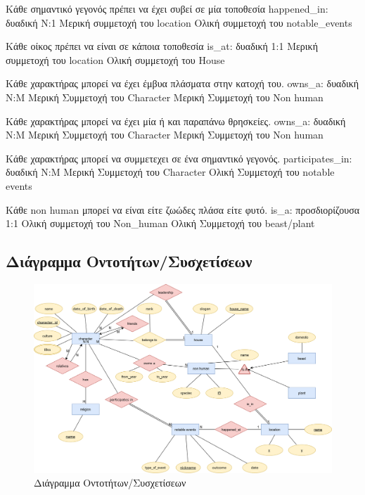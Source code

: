 \documentclass[../main.tex]{subfiles}
\begin{document}
{Κάθε σημαντικό γεγονός πρέπει να έχει συβεί σε μία τοποθεσία}
{happened\_in: δυαδική}
{Ν:1}
{Μερική συμμετοχή του location \newline Ολική συμμετοχή του notable\_events}
{}

{Κάθε οίκος πρέπει να είναι σε κάποια τοποθεσία}
{is\_at: δυαδική}
{1:1}
{Μερική συμμετοχή του location \newline Ολική συμμετοχή του House}
{}

{Κάθε χαρακτήρας μπορεί να έχει έμβυα πλάσματα στην κατοχή του. }
{owns\_a: δυαδική}
{N:M}
{Μερική Συμμετοχή του Character \newline Μερική Συμμετοχή του Non human}
{}

{Κάθε χαρακτήρας μπορεί να έχει μία ή και παραπάνω θρησκείες.}
{owns\_a: δυαδική}
{N:M}
{Μερική Συμμετοχή του Character \newline Μερική Συμμετοχή του Non human}
{}

{Κάθε χαρακτήρας μπορεί να συμμετεχει σε ένα σημαντικό γεγονός.}
{participates\_in: δυαδική}
{N:M}
{Μερική Συμμετοχή του Character \newline Ολική Συμμετοχή του notable events}
{}

{Κάθε non human μπορεί να είναι είτε ζωώδες πλάσα είτε φυτό.}
{is\_a: προσδιορίζουσα }
{1:1}
{Ολική συμμετοχή του Non\_human \newline Ολική Συμμετοχή του beast/plant }
{}









\subsection{Διάγραμμα Οντοτήτων/Συσχετίσεων}

\begin{figure}[H]
	\includegraphics[width=\textwidth]{../images/entity_relation_diagram.png}
	\caption{Διάγραμμα Οντοτήτων/Συσχετίσεων}
\end{figure}
\end{document}
